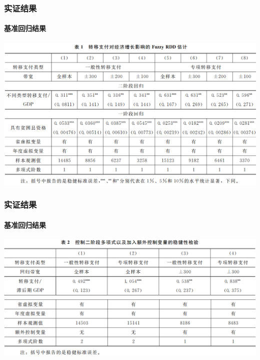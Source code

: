\begin{frame}[t]
	\frametitle{实证结果}
	\framesubtitle{基准回归结果}
	\begin{center}
		\includegraphics[width=\textwidth]{image/b1.png}
	\end{center}
	
\end{frame}

\begin{frame}[t]
	\frametitle{实证结果}
	\framesubtitle{基准回归结果}
	\begin{center}
		\includegraphics[width=\textwidth]{image/b2.png}
		\includegraphics[width=\textwidth]{image/b21.png}
	\end{center}
	
\end{frame}

